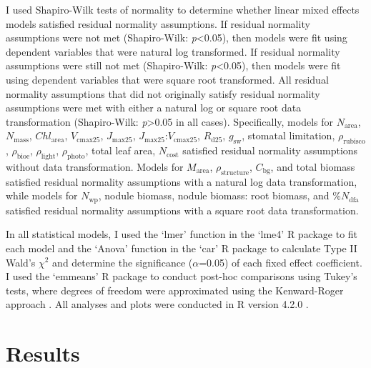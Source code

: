 I used Shapiro-Wilk tests of normality to determine whether linear mixed effects models satisfied residual normality assumptions. If residual normality assumptions were not met (Shapiro-Wilk: \textit{p}<0.05), then models were fit using dependent variables that were natural log transformed. If residual normality assumptions were still not met (Shapiro-Wilk: \textit{p}<0.05), then models were fit using dependent variables that were square root transformed. All residual normality assumptions that did not originally satisfy residual normality assumptions were met with either a natural log or square root data transformation (Shapiro-Wilk: \textit{p}>0.05 in all cases). Specifically, models for $N_\mathrm{area}$, $N_\mathrm{mass}$, $Chl_\mathrm{area}$, $V_\mathrm{cmax25}$, $J_\mathrm{max25}$, $J_\mathrm{max25}$:$V_\mathrm{cmax25}$, $R_\mathrm{d25}$, $g_\mathrm{sw}$, stomatal limitation, $\rho_\mathrm{rubisco}$, $\rho_\mathrm{bioe}$, $\rho_\mathrm{light}$, $\rho_\mathrm{photo}$, total leaf area, $N_\mathrm{cost}$ satisfied residual normality assumptions without data transformation. Models for $M_\mathrm{area}$, $\rho_\mathrm{structure}$, $C_\mathrm{bg}$, and total biomass satisfied residual normality assumptions with a natural log data transformation, while models for $N_\mathrm{wp}$, nodule biomass, nodule biomass: root biomass, and \%$N_\mathrm{dfa}$ satisfied residual normality assumptions with a square root data transformation.

In all statistical models, I used the `lmer' function in the `lme4' R package  to fit each model and the `Anova' function in the `car' R package  to calculate Type II Wald's $\chi^{2}$ and determine the significance ($\alpha$=0.05) of each fixed effect coefficient. I used the `emmeans' R package  to conduct post-hoc comparisons using Tukey's tests, where degrees of freedom were approximated using the Kenward-Roger approach . All analyses and plots were conducted in R version 4.2.0 .

\section{Results}

